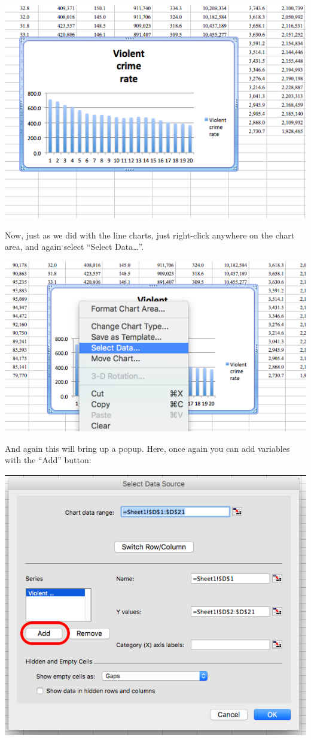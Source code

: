 \documentclass[
]{book}
\begin{document}
\includegraphics{imgs/stackedbar_2.png}

Now, just as we did with the line charts, just right-click anywhere on the chart area, and again select ``Select Data\ldots{}''.

\includegraphics{imgs/stackedbar_3.png}

And again this will bring up a popup. Here, once again you can add variables with the ``Add'' button:

\includegraphics{imgs/stackedbar_4.png}
\end{document}
